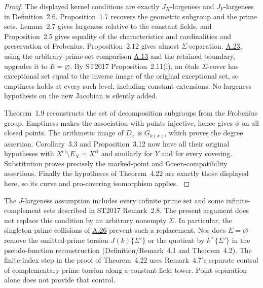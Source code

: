 \documentclass[11pt,a4paper]{article}
\newcommand{\cl}{\mathrm{cl}}
\newcommand{\statementref}[1]{\hyperlink{#1}{#1}}
\begin{document}
\begin{proof}
The displayed kernel conditions are exactly $J_X$-largeness and
$J_Y$-largeness in Definition~2.6. Proposition~1.7 recovers the
geometric subgroup and the prime sets. Lemma~2.7 gives largeness
relative to the constant fields, and Proposition~2.5 gives equality
of the characteristics and cardinalities and preservation of
Frobenius. Proposition~2.12 gives almost $\Sigma$-separation.
\statementref{A.23}, using the arbitrary-prime-set comparison
\statementref{A.13} and the retained boundary, upgrades it to
$E=\varnothing$. By ST2017 Proposition~2.11(i), an \'etale
$\Sigma$-cover has exceptional set equal to the inverse image of
the original exceptional set, so emptiness holds at every such
level, including constant extensions. No largeness hypothesis on
the new Jacobian is silently added.

Theorem~1.9 reconstructs the set of decomposition subgroups from
the Frobenius group. Emptiness makes the association with points
injective, hence gives $\phi$ on all closed points. The arithmetic
image of $D_x$ is $G_{k(x)}$, which proves the degree assertion.
Corollary~3.3 and Proposition~3.12 now have all their original
hypotheses with $X^{\cl}\setminus E_X=X^{\cl}$ and similarly
for $Y$ and for every covering. Substitution proves precisely the
marked-point and Green-compatibility assertions. Finally the
hypotheses of Theorem~4.22 are exactly those displayed here,
so its curve and pro-covering isomorphism applies.
\citep[Proposition~1.7, Theorem~1.9, Proposition~2.5,
Lemma~2.7, Propositions~2.11--2.12, Corollary~3.3,
Proposition~3.12, Theorem~4.22]{LA_ST2017}
\end{proof}

The $J$-largeness assumption includes every cofinite prime set and
some infinite-complement sets described in ST2017 Remark~2.8.
The present argument does not replace this condition by an arbitrary
nonempty $\Sigma$. In particular, the singleton-prime collisions
of \statementref{A.26} prevent such a replacement. Nor does
$E=\varnothing$ remove the omitted-prime torsion
$J(k)\{\Sigma'\}$ or the quotient by
$k^\times\{\Sigma'\}$ in the pseudo-function reconstruction
(Definition/Remark~4.1 and Theorem~4.2). The finite-index step in
the proof of Theorem~4.22 uses Remark~4.7's separate control of
complementary-prime torsion along a constant-field tower. Point
separation alone does not provide that control.
\end{document}
